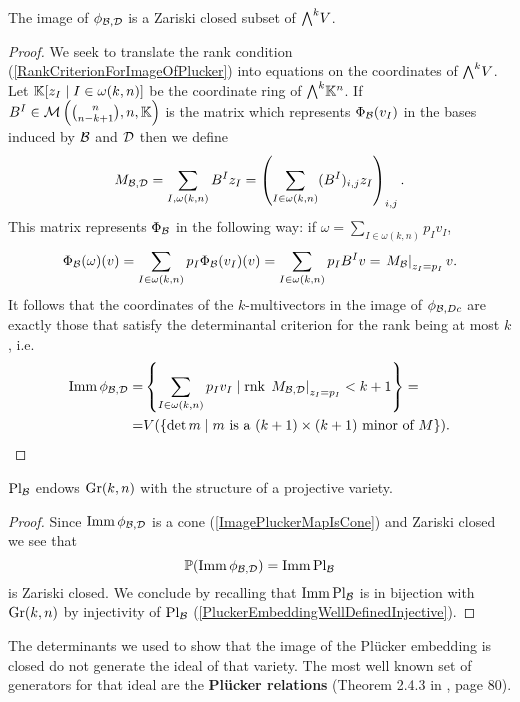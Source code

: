 \begin{theorem}\label{ImageOfPhiClosed}
The image of $\phi_{\mathcal{B},\mathcal{D}}$ is a Zariski closed subset of $\bw V$.
\end{theorem}
\begin{proof}
We seek to translate the rank condition (\ref{RankCriterionForImageOfPlucker}) into equations on the coordinates of $\bw V$. Let $\mathbb{K}[z_I\mid I\in\omega(k,n)]$ be the coordinate ring of $\bw \K^n$. If $B^I\in \mathcal{M}\left({\binom{n}{n-k+1},n,\mathbb{K}}\right)$ is the matrix which represents $\Phi_{\mathcal{B}}(v_I)$ in the bases induced by $\mathcal{B}$ and $\mathcal{D}$ then we define
\[M_{\mathcal{B},\mathcal{D}}=\sum_{I,\omega(k,n)}B^I z_I=\left({\sum_{I\in\omega(k,n)}(B^I)_{i,j}z_I}\right)_{i,j}.\]
This matrix represents $\Phi_{\mathcal{B}}$ in the following way: if $\omega=\sum_{I\in\omega(k,n)}p_I v_I$,
\[\Phi_{\mathcal{B}}(\omega)(v)=\sum_{I\in \omega(k,n)}p_I \Phi_{\mathcal{B}}(v_I)(v)=\sum_{I\in \omega(k,n)}p_I B^I v=\left.{M_{\mathcal{B}}}\right|_{z_I=p_I}v.\]
It follows that the coordinates of the $k$-multivectors in the image of $\phi_{\mathcal{B},Dc}$ are exactly those that satisfy the determinantal criterion for the rank being at most $k$, i.e.
\begin{align*}
\mathrm{Imm}\, \phi_{\mathcal{B},\mathcal{D}}=&\left\{{\sum_{I\in \omega(k,n)}p_I v_I\mid \mathrm{rnk}\, \left.{M_{\mathcal{B},\mathcal{D}}}\right|_{z_I=p_I}<k+1}\right\}=\\
=&V(\left\{{\det m\mid \text{$m$ is a $(k+1)\times (k+1)$ minor of $M$}}\right\}).
\end{align*}
\end{proof}
\begin{corollary}\label{ImageOfPluckerEmbeddingIsClosed}
$\mathrm{Pl}_{\mathcal{B}}$ endows $\mathrm{Gr}(k,n)$ with the structure of a projective variety.
\end{corollary}
\begin{proof}
Since $\mathrm{Imm}\,\phi_{\mathcal{B},\mathcal{D}}$ is a cone (\ref{ImagePluckerMapIsCone}) and Zariski closed we see that 
\[\mathbb{P}(\mathrm{Imm}\, \phi_{\mathcal{B},\mathcal{D}})=\mathrm{Imm}\, \mathrm{Pl}_{\mathcal{B}}\]
is Zariski closed.
We conclude by recalling that $\mathrm{Imm}\,\mathrm{Pl}_{\mathcal{B}}$ is in bijection with $\mathrm{Gr}(k,n)$ by injectivity of $\mathrm{Pl}_{\mathcal{B}}$ (\ref{PluckerEmbeddingWellDefinedInjective}).
\end{proof}

\begin{remark}
The determinants we used to show that the image of the Pl\"ucker embedding is closed do not generate the ideal of that variety. The most well known set of generators for that ideal are the \textbf{Pl\"ucker relations} (Theorem 2.4.3 in \cite{matroids}, page 80).
\end{remark}




